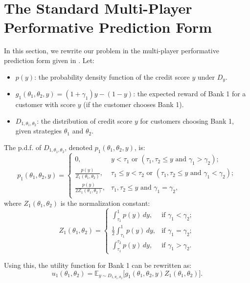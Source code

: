 



\section{The Standard Multi-Player Performative Prediction Form}
\label{Appendix:refumulation}
In this section, we rewrite our problem in the multi-player performative prediction form given in \cite{narang2023multiplayer}.  Let: 
\begin{itemize}
    \item \(p(y)\): the probability density function of the credit score \(y\) under \(D_y\).
    \item \(g_1(\theta_1, \theta_2, y) = (1 + \gamma_1)y - (1 - y)\): the expected reward of Bank 1 for a customer with score \(y\) (if the customer chooses Bank 1).
    \item \(D_{1, \theta_1, \theta_2}\): the distribution of credit score \(y\) for customers choosing Bank 1, given strategies \(\theta_1\) and \(\theta_2\).
\end{itemize}

The p.d.f. of \(D_{1, \theta_1, \theta_2}\), denoted \(p_1(\theta_1, \theta_2, y)\), is:
\[
p_1(\theta_1, \theta_2, y) =  
\begin{cases}
0,  & y < \tau_1 \text{ or } (\tau_1, \tau_2 \leq y \text{ and } \gamma_1 > \gamma_2);    \\
\frac{p(y)}{Z_1(\theta_1, \theta_2)},   & \tau_1 \leq y < \tau_2 \text{ or } (\tau_1, \tau_2 \leq y \text{ and } \gamma_1 < \gamma_2); \\
\frac{p(y)}{2Z_1(\theta_1, \theta_2)}, & \tau_1, \tau_2 \leq y \text{ and } \gamma_1 = \gamma_2,             \\
\end{cases}
\]
where \(Z_1(\theta_1, \theta_2)\) is the normalization constant:
\[
Z_1(\theta_1, \theta_2) = 
\begin{cases}
\int_{\tau_1}^1 p(y) \, dy,  & \text{if } \gamma_1 < \gamma_2; \\
\frac{1}{2} \int_{\tau_1}^1 p(y) \, dy,  & \text{if } \gamma_1 = \gamma_2; \\
\int_{\tau_1}^{\tau_2} p(y) \, dy, & \text{if } \gamma_1 > \gamma_2.
\end{cases}
\]

Using this, the utility function for Bank 1 can be rewritten as:
\[
u_1(\theta_1, \theta_2) = \mathbb{E}_{y \sim D_{1, \theta_1, \theta_2}} \big[g_1(\theta_1, \theta_2, y) Z_1(\theta_1, \theta_2)\big].
\]

